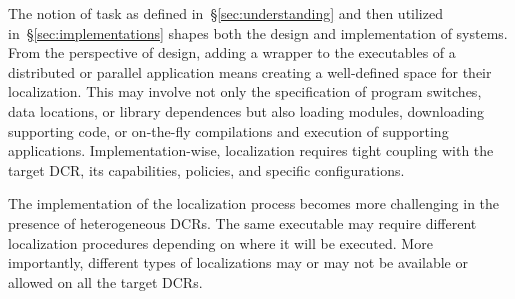 \documentclass{sig-alternate}
\begin{document}
 




The notion of task as defined in~\S\ref{sec:understanding} and then utilized
in~\S\ref{sec:implementations} shapes both the design and implementation of
\pilot systems. From the perspective of design, adding a wrapper to the
executables of a distributed or parallel application means creating a
well-defined space for their localization. This may involve not only the
specification of program switches, data locations, or library dependences but
also loading modules, downloading supporting code, or on-the-fly compilations
and execution of supporting applications. Implementation-wise, localization
requires tight coupling with the target DCR, its capabilities, policies, and
specific configurations.

The implementation of the localization process becomes more challenging in the
presence of heterogeneous DCRs. The same executable may require different
localization procedures depending on where it will be executed. More
importantly, different types of localizations may or may not be available or
allowed on all the target DCRs. %

\end{document}
